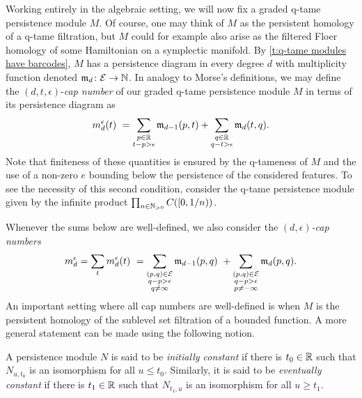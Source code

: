 Working entirely in the algebraic setting, we will now fix a graded q-tame persistence module $M$.
Of course, one may think of $M$ as the persistent homology of a q-tame filtration, but $M$ could for example also arise as the filtered Floer homology of some Hamiltonian on a symplectic manifold.
By \cref{t:q-tame modules have barcodes}, $M$ has a persistence diagram in every degree $d$ with multiplicity function denoted $\mathfrak{m}_d \colon \mathcal{E} \to \mathbb{N}$.
In analogy to Morse's definitions, we may define the $(d, t, \epsilon)$-\emph{cap number} of our graded q-tame persistence module $M$ in terms of its persistence diagram as
\begin{equation*}
m_{d}^{\epsilon}(t) \ =
\sum_{\substack{p \in \mathbb{R} \\ t - p > \epsilon}} \mathfrak{m}_{d-1}(p, t) +
\sum_{\substack{q \in \mathbb{R} \\ q - t > \epsilon}} \mathfrak{m}_d(t, q).
\end{equation*}
Note that finiteness of these quantities is ensured by the q-tameness of $M$ and the use of a non-zero $e$ bounding below the persistence of the considered features.
To see the necessity of this second condition, consider the q-tame persistence module given by the infinite product $\prod_{n \in \mathbb{N}_{> 0}} C([0,1/n))$.

Whenever the sums below are well-defined, we also consider the \emph{$(d,\epsilon)$-cap numbers} 
\begin{equation} \label{e:cap numbers}
m_{d}^{\epsilon} =
\sum_{t} m_{d}^{\epsilon}(t) \ =
\sum_{\substack{(p,q) \in \mathcal{E} \\ q - p > \epsilon \\ q \neq \infty}} \mathfrak{m}_{d-1}(p,q) \ +
\sum_{\substack{(p,q) \in \mathcal{E} \\ q - p > \epsilon \\ p \neq -\infty}}\mathfrak{m}_d(p,q).
\end{equation}
An important setting where all cap numbers are well-defined is when $M$ is the persistent homology of the sublevel set filtration of a bounded function.
A more general statement can be made using the following notion.

\begin{defi} \label{d:initially and eventually constant}
	A persistence module $N$ is said to be \emph{initially constant} if there is $t_0 \in \mathbb{R}$ such that $N_{u,t_0}$ is an isomorphism for all $u \leq t_0$.
	Similarly, it is said to be \emph{eventually constant} if there is $t_1 \in \mathbb{R}$ such that $N_{t_1,u}$ is an isomorphism for all $u \geq t_1$.
\end{defi}


